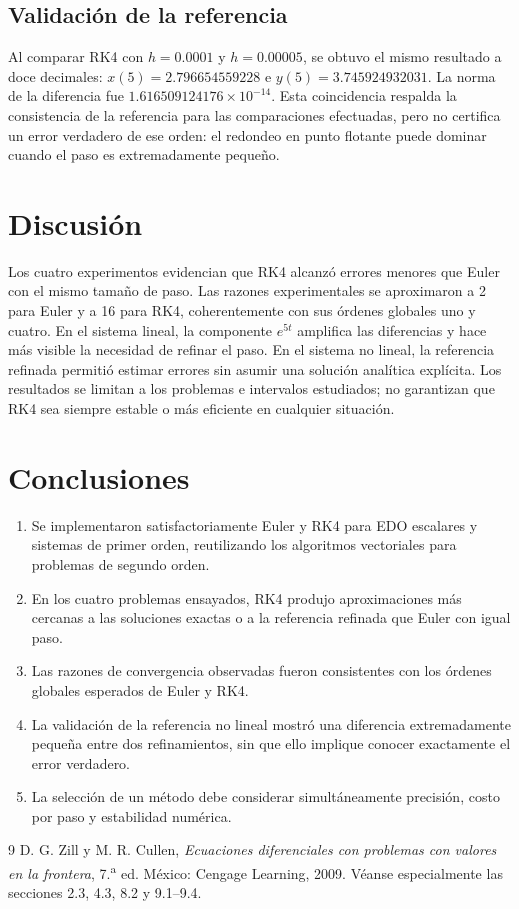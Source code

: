 \documentclass[12pt,letterpaper]{article}
\begin{document}
\subsection{Validación de la referencia}
Al comparar RK4 con $h=0.0001$ y $h=0.00005$, se obtuvo el mismo resultado a doce decimales: $x(5)=2.796654559228$ e $y(5)=3.745924932031$. La norma de la diferencia fue $1.616509124176\times10^{-14}$. Esta coincidencia respalda la consistencia de la referencia para las comparaciones efectuadas, pero no certifica un error verdadero de ese orden: el redondeo en punto flotante puede dominar cuando el paso es extremadamente pequeño.
\section{Discusión}
Los cuatro experimentos evidencian que RK4 alcanzó errores menores que Euler con el mismo tamaño de paso. Las razones experimentales se aproximaron a 2 para Euler y a 16 para RK4, coherentemente con sus órdenes globales uno y cuatro. En el sistema lineal, la componente $e^{5t}$ amplifica las diferencias y hace más visible la necesidad de refinar el paso. En el sistema no lineal, la referencia refinada permitió estimar errores sin asumir una solución analítica explícita. Los resultados se limitan a los problemas e intervalos estudiados; no garantizan que RK4 sea siempre estable o más eficiente en cualquier situación.
\section{Conclusiones}
\begin{enumerate}
\item Se implementaron satisfactoriamente Euler y RK4 para EDO escalares y sistemas de primer orden, reutilizando los algoritmos vectoriales para problemas de segundo orden.
\item En los cuatro problemas ensayados, RK4 produjo aproximaciones más cercanas a las soluciones exactas o a la referencia refinada que Euler con igual paso.
\item Las razones de convergencia observadas fueron consistentes con los órdenes globales esperados de Euler y RK4.
\item La validación de la referencia no lineal mostró una diferencia extremadamente pequeña entre dos refinamientos, sin que ello implique conocer exactamente el error verdadero.
\item La selección de un método debe considerar simultáneamente precisión, costo por paso y estabilidad numérica.
\end{enumerate}
\clearpage
{}
{}
\begin{thebibliography}{9}
 D. G. Zill y M. R. Cullen, \textit{Ecuaciones diferenciales con problemas con valores en la frontera}, 7.\textsuperscript{a} ed. México: Cengage Learning, 2009. Véanse especialmente las secciones 2.3, 4.3, 8.2 y 9.1--9.4.
\end{thebibliography}
\end{document}
